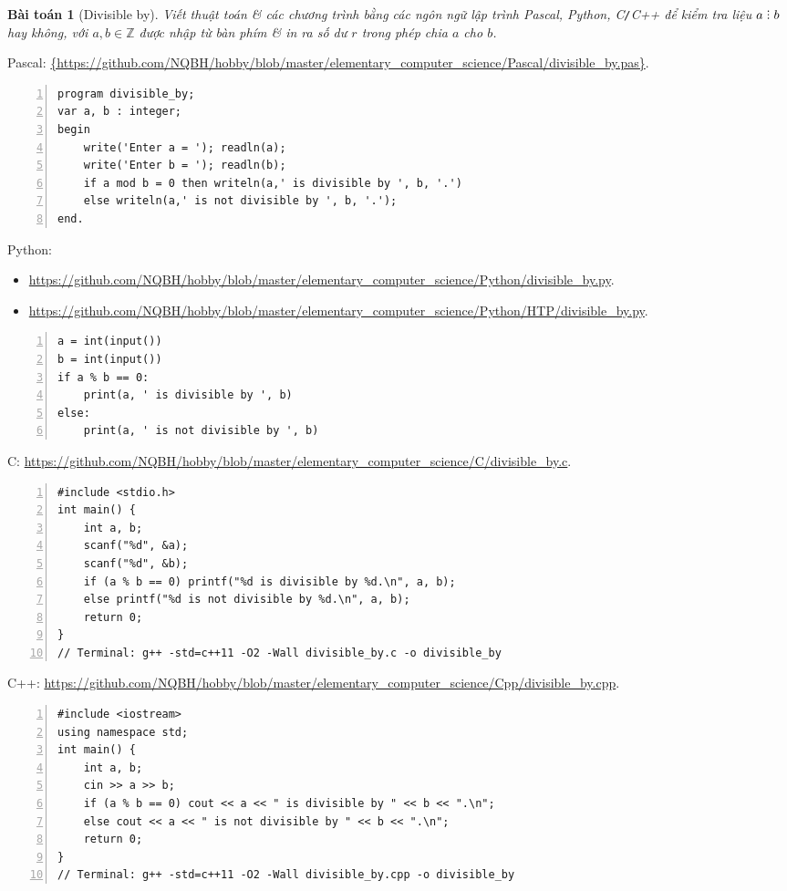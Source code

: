 \documentclass{article}
\newtheorem{baitoan}{Bài toán}
\DeclareRobustCommand{\divby}{%
	\mathrel{\vbox{\baselineskip.65ex\lineskiplimit0pt\hbox{.}\hbox{.}\hbox{.}}}%
}
\begin{document}
\begin{baitoan}[Divisible by]
	Viết thuật toán \& các chương trình bằng các ngôn ngữ lập trình {\sf Pascal, Python, C\texttt{/}C++} để kiểm tra liệu $a\divby b$ hay không, với $a,b\in\mathbb{Z}$ được nhập từ bàn phím \& in ra số dư $r$ trong phép chia $a$ cho $b$.
\end{baitoan}
\noindent Pascal: \url{{https://github.com/NQBH/hobby/blob/master/elementary_computer_science/Pascal/divisible_by.pas}}.
\begin{Verbatim}[numbers=left,xleftmargin=5mm]
program divisible_by;
var a, b : integer;
begin
    write('Enter a = '); readln(a);
    write('Enter b = '); readln(b);
    if a mod b = 0 then writeln(a,' is divisible by ', b, '.')
    else writeln(a,' is not divisible by ', b, '.');
end.
\end{Verbatim}
Python:
\begin{itemize}
	\item \url{https://github.com/NQBH/hobby/blob/master/elementary_computer_science/Python/divisible_by.py}.
	\item \url{https://github.com/NQBH/hobby/blob/master/elementary_computer_science/Python/HTP/divisible_by.py}.
\end{itemize} 
\begin{Verbatim}[numbers=left,xleftmargin=5mm]
a = int(input())
b = int(input())
if a % b == 0:
    print(a, ' is divisible by ', b)
else:
    print(a, ' is not divisible by ', b)
\end{Verbatim}
C: \url{https://github.com/NQBH/hobby/blob/master/elementary_computer_science/C/divisible_by.c}.
\begin{Verbatim}[numbers=left,xleftmargin=5mm]
#include <stdio.h>
int main() {
    int a, b;
    scanf("%d", &a);
    scanf("%d", &b);
    if (a % b == 0) printf("%d is divisible by %d.\n", a, b);
    else printf("%d is not divisible by %d.\n", a, b);
    return 0;
}
// Terminal: g++ -std=c++11 -O2 -Wall divisible_by.c -o divisible_by
\end{Verbatim}
C++: \url{https://github.com/NQBH/hobby/blob/master/elementary_computer_science/Cpp/divisible_by.cpp}.
\begin{Verbatim}[numbers=left,xleftmargin=5mm]
#include <iostream>
using namespace std;
int main() {
    int a, b;
    cin >> a >> b;
    if (a % b == 0) cout << a << " is divisible by " << b << ".\n";
    else cout << a << " is not divisible by " << b << ".\n";
    return 0;
}
// Terminal: g++ -std=c++11 -O2 -Wall divisible_by.cpp -o divisible_by
\end{Verbatim}
\end{document}
